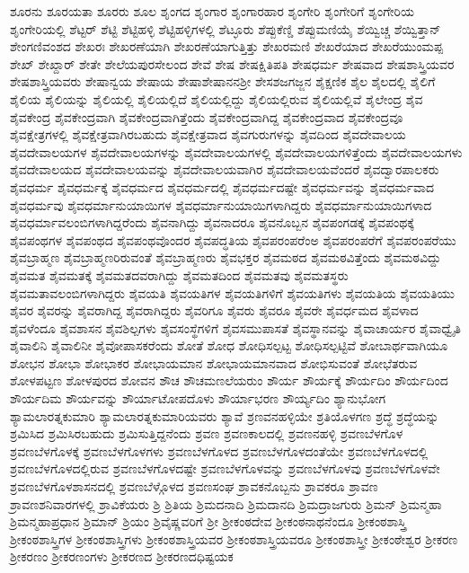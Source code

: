 {ಶೂರನು
ಶೂರಯತಾ
ಶೂರರು
ಶೂಲ
ಶೃಂಗದ
ಶೃಂಗಾರ
ಶೃಂಗಾರಹಾರ
ಶೃಂಗೇರಿ
ಶೃಂಗೇರಿಗೆ
ಶೃಂಗೇರಿಯ
ಶೃಂಗೇರಿಯಲ್ಲಿ
ಶೆಟ್ಟರ್
ಶೆಟ್ಟಿ
ಶೆಟ್ಟಿಹಳ್ಳಿ
ಶೆಟ್ಟಿಹಳ್ಳಿಗಳಲ್ಲಿ
ಶೆಟ್ಳೂರು
ಶೆಪ್ಪುಕೆಣ್ಡಿ
ಶೆಪ್ಪುಮಣಿಯೈ
ಶೆಯ್ವಿಚ್ಚ
ಶೆಯ್ವಿತ್ತಾನ್
ಶೇಂಗಣಿವಂಶದ
ಶೇಖರಃ
ಶೇಖರಣೆಯಾಗಿ
ಶೇಖರಣೆಯಾಗುತ್ತಿತ್ತು
ಶೇಖರಮಣಿ
ಶೇಖರೆಯಾದ
ಶೇಖರೆಯುಂಮಪ್ಪ
ಶೇಖ್
ಶೇಖ್ದಾರ್
ಶೇತೇ
ಶೇಲೆಯಪುರಸೇಲಂದ
ಶೇವೆ
ಶೇಷ
ಶೇಷಕ್ಷಿತಿಪತಿ
ಶೇಷಧರ್ಮ
ಶೇಷವಾದ
ಶೇಷಶಾಸ್ತ್ರಿಯವರ
ಶೇಷಶಾಸ್ತ್ರಿಯವರು
ಶೇಷಾನ್ವಯ
ಶೇಷಾಯ
ಶೇಷಾಶೇಷಾನನಶ್ರೀ
ಶೇಸಶಜಗಜ್ಜನ
ಶೈಕ್ಷಣಿಕ
ಶೈಲ
ಶೈಲದಲ್ಲಿ
ಶೈಲಿಗೆ
ಶೈಲಿಯ
ಶೈಲಿಯನ್ನು
ಶೈಲಿಯಲ್ಲಿ
ಶೈಲಿಯಲ್ಲಿದೆ
ಶೈಲಿಯಲ್ಲಿದ್ದು
ಶೈಲಿಯಲ್ಲಿರುವ
ಶೈಲಿಯಲ್ಲಿವೆ
ಶೈಲೇಂದ್ರ
ಶೈವ
ಶೈವಕೇಂದ್ರ
ಶೈವಕೇಂದ್ರವಾಗಿ
ಶೈವಕೇಂದ್ರವಾಗಿತ್ತೆಂದು
ಶೈವಕೇಂದ್ರವಾಗಿದ್ದ
ಶೈವಕೇಂದ್ರವಾದ
ಶೈವಕೇಂದ್ರವೂ
ಶೈವಕ್ಷೇತ್ರಗಳಲ್ಲಿ
ಶೈವಕ್ಷೇತ್ರವಾಗಿರಬಹುದು
ಶೈವಕ್ಷೇತ್ರವಾದ
ಶೈವಗುರುಗಳನ್ನು
ಶೈವದಿಂದ
ಶೈವದೇವಾಲಯ
ಶೈವದೇವಾಲಯಗಳ
ಶೈವದೇವಾಲಯಗಳನ್ನು
ಶೈವದೇವಾಲಯಗಳಲ್ಲಿ
ಶೈವದೇವಾಲಯಗಳಿತ್ತೆಂದು
ಶೈವದೇವಾಲಯಗಳು
ಶೈವದೇವಾಲಯದ
ಶೈವದೇವಾಲಯವನ್ನು
ಶೈವದೇವಾಲಯವಾಗಿರ
ಶೈವದೇವಾಲಯವೆಂದರೆ
ಶೈವದ್ವಾರಪಾಲಕರು
ಶೈವಧರ್ಮ
ಶೈವಧರ್ಮಕ್ಕೆ
ಶೈವಧರ್ಮದ
ಶೈವಧರ್ಮದಲ್ಲಿ
ಶೈವಧರ್ಮದಷ್ಟೇ
ಶೈವಧರ್ಮವನ್ನು
ಶೈವಧರ್ಮವಾದ
ಶೈವಧರ್ಮವು
ಶೈವಧರ್ಮಾನುಯಾಯಿಗಳ
ಶೈವಧರ್ಮಾನುಯಾಯಿಗಳಾಗಿದ್ದರು
ಶೈವಧರ್ಮಾನುಯಾಯಿಗಳಾದ
ಶೈವಧರ್ಮಾವಲಂಬಿಗಳಾಗಿದ್ದರೆಂದು
ಶೈವನಾಗಿದ್ದು
ಶೈವನಾದರೂ
ಶೈವನೊಬ್ಬನ
ಶೈವಪಂಗಡಕ್ಕೆ
ಶೈವಪಂಥಕ್ಕೆ
ಶೈವಪಂಥಗಳ
ಶೈವಪಂಥದ
ಶೈವಪಂಥವೊಂದರ
ಶೈವಪದ್ಧತಿಯ
ಶೈವಪರಂಪರೆಂಅ
ಶೈವಪರಂಪರೆಗೆ
ಶೈವಪರಂಪರೆಯು
ಶೈವಬ್ರಾಹ್ಮಣ
ಶೈವಬ್ರಾಹ್ಮಣರಿರುವಂತೆ
ಶೈವಬ್ರಾಹ್ಮಣರು
ಶೈವಭಕ್ತರ
ಶೈವಮಠದ
ಶೈವಮಠವಿತ್ತೆಂದು
ಶೈವಮಠವಿದ್ದು
ಶೈವಮತ
ಶೈವಮತಕ್ಕೆ
ಶೈವಮತದವರಾಗಿದ್ದು
ಶೈವಮತದಿಂದ
ಶೈವಮತವು
ಶೈವಮತಸ್ಥರು
ಶೈವಮತಾವಲಂಬಿಗಳಾಗಿದ್ದರು
ಶೈವಯತಿ
ಶೈವಯತಿಗಳ
ಶೈವಯತಿಗಳಿಗೆ
ಶೈವಯತಿಗಳು
ಶೈವಯತಿಯ
ಶೈವಯತಿಯು
ಶೈವರ
ಶೈವರನ್ನು
ಶೈವರಾಗಿದ್ದ
ಶೈವರಾಗಿದ್ದರು
ಶೈವರಿಗೂ
ಶೈವರು
ಶೈವರೂ
ಶೈವರೇ
ಶೈವರ್ಧಮದ
ಶೈವಳಾದ
ಶೈವಳೆಂದೂ
ಶೈವಶಾಸನ
ಶೈವಶಿಲ್ಪಗಳು
ಶೈವಸಂಸ್ಥೆಗಳಿಗೆ
ಶೈವಸಮುಪಾಸತೆ
ಶೈವಸ್ಥಾನವನ್ನು
ಶೈವಾಚಾರ್ಯರ
ಶೈವಾಧ್ವೈತಿ
ಶೈವಾಲಿನಿ
ಶೈವಾಲಿನೀ
ಶೈವೋಪಾಸಕರೆಂದು
ಶೋತೆ
ಶೋಧ
ಶೋಧಿಸಲ್ಪಟ್ಟ
ಶೋಧಿಸಲ್ಪಟ್ಟಿವೆ
ಶೋಬಾರ್ಥವಾಗಿಯೂ
ಶೋಭನ
ಶೋಭಾ
ಶೋಭಾಕರ
ಶೋಭಾಯಮಾನ
ಶೋಭಾಯಮಾನವಾದ
ಶೋಭಿಸುವಂತೆ
ಶೋಭೆತರುವ
ಶೋಳಪಟ್ಟಣ
ಶೋಳಪುರದ
ಶೋವನ
ಶೌಚ
ಶೌಚಮಣಲೆಯರುಂ
ಶೌರ್ಯ
ಶೌರ್ಯಕ್ಕೆ
ಶೌರ್ಯದಿಂ
ಶೌರ್ಯದಿಂದ
ಶೌರ್ಯದಿಮ
ಶೌರ್ಯವನ್ನು
ಶೌರ್ಯಾಟೋಪದೊಳು
ಶೌರ್ಯಾಭರಣ
ಶೌರ್ಯ್ಯದಿಂ
ಶ್ಯಾನುಭೋಗ
ಶ್ಯಾಮಲಾರತ್ನಕುಮಾರಿ
ಶ್ಯಾಮಲಾರತ್ನಕುಮಾರಿಯವರು
ಶ್ಯಾವೆ
ಶ್ರಣವನಹಳ್ಳಿಯೇ
ಶ್ರತಿಯೊಳಗಣ
ಶ್ರದ್ಧೆ
ಶ್ರದ್ಧೆಯನ್ನು
ಶ್ರಮಿಸಿದ
ಶ್ರಮಿಸಿರಬಹುದು
ಶ್ರಮಿಸುತ್ತಿದ್ದನೆಂದು
ಶ್ರವಣ
ಶ್ರವಣಕಾಲದಲ್ಲಿ
ಶ್ರವಣನಹಳ್ಳಿ
ಶ್ರವಣಬೆಳಗೊಳ
ಶ್ರವಣಬೆಳಗೊಳಕ್ಕೆ
ಶ್ರವಣಬೆಳಗೊಳಗಳು
ಶ್ರವಣಬೆಳಗೊಳದ
ಶ್ರವಣಬೆಳಗೊಳದಂತೆಯೇ
ಶ್ರವಣಬೆಳಗೊಳದಲ್ಲಿ
ಶ್ರವಣಬೆಳಗೊಳದಲ್ಲಿರುವ
ಶ್ರವಣಬೆಳಗೊಳದಷ್ಟೇ
ಶ್ರವಣಬೆಳಗೊಳವನ್ನು
ಶ್ರವಣಬೆಳಗೊಳವು
ಶ್ರವಣಬೆಳಗೊಳವೇ
ಶ್ರವಣಬೆಳಗೊಳಶಾಸನದಲ್ಲಿ
ಶ್ರವಣಬೆಳ್ಗೊಳದ
ಶ್ರವಣಸಂಘ
ಶ್ರಾವಕನೊಬ್ಬನು
ಶ್ರಾವಕರೂ
ಶ್ರಾವಣ
ಶ್ರಾವಣಶನಿವಾರಗಳಲ್ಲಿ
ಶ್ರಾವಿಕೆಯರು
ಶ್ರಿ
ಶ್ರಿತಿಯ
ಶ್ರಿಮದನಾದಿ
ಶ್ರಿಮದಾನದಿ
ಶ್ರಿಮದ್ರಾಜಗುರು
ಶ್ರಿಮನ್
ಶ್ರಿಮನ್ಮಹಾ
ಶ್ರಿಮನ್ಮಹಾಪ್ರಧಾನ
ಶ್ರಿಮಾನ್
ಶ್ರಿಯಂ
ಶ್ರಿವೈಷ್ಣವರಿಗೆ
ಶ್ರೀ
ಶ್ರೀಕಂಠದೇವ
ಶ್ರೀಕಂಠನಾಥನೆಂದೂ
ಶ್ರೀಕಂಠಶಾಸ್ತ್ರಿ
ಶ್ರೀಕಂಠಶಾಸ್ತ್ರಿಗಳ
ಶ್ರೀಕಂಠಶಾಸ್ತ್ರಿಗಳು
ಶ್ರೀಕಂಠಶಾಸ್ತ್ರಿಯವರ
ಶ್ರೀಕಂಠಶಾಸ್ತ್ರಿಯವರೂ
ಶ್ರೀಕಂಠಶಾಸ್ತ್ರೀ
ಶ್ರೀಕಂಠೇಶ್ವರ
ಶ್ರೀಕರಣ
ಶ್ರೀಕರಣಂ
ಶ್ರೀಕರಣಂಗಳು
ಶ್ರೀಕರಣದ
ಶ್ರೀಕರಣದಧಿಷ್ಟಯಕ
}
